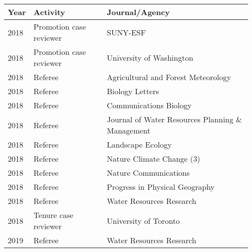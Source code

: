 
\begin{longtable}{llp{12cm}}
Year & Activity & Journal/Agency\\
\hline 
\endhead 
2018 & Promotion case reviewer & SUNY-ESF  \\
2018 & Promotion case reviewer & University of Washington  \\
2018 & Referee & Agricultural and Forest Meteorology  \\
2018 & Referee & Biology Letters  \\
2018 & Referee & Communications Biology  \\
2018 & Referee & Journal of Water Resources Planning \& Management  \\
2018 & Referee & Landscape Ecology  \\
2018 & Referee & Nature Climate Change  (3)  \\
2018 & Referee & Nature Communications  \\
2018 & Referee & Progress in Physical Geography  \\
2018 & Referee & Water Resources Research  \\
2018 & Tenure case reviewer & University of Toronto  \\
2019 & Referee & Water Resources Research  \\
\end{longtable}

